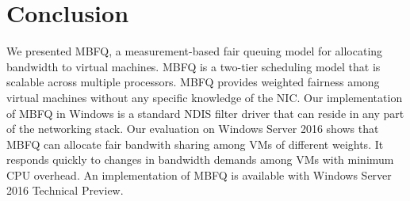 \section{Conclusion}
\label{sec:conclusion}

We presented MBFQ, a measurement-based fair queuing model for allocating bandwidth to virtual machines.
MBFQ is a two-tier scheduling model that is scalable across multiple processors.  MBFQ provides weighted
fairness among virtual machines without any specific knowledge of the NIC.  Our implementation 
of MBFQ in Windows is a standard NDIS filter driver that can reside in any part of the networking stack.  Our evaluation
on Windows Server 2016 shows that MBFQ can allocate fair bandwith sharing among VMs of different weights. It
responds quickly to changes in bandwidth demands among VMs with minimum CPU overhead.  An implementation of 
MBFQ is available with Windows Server 2016 Technical Preview.



